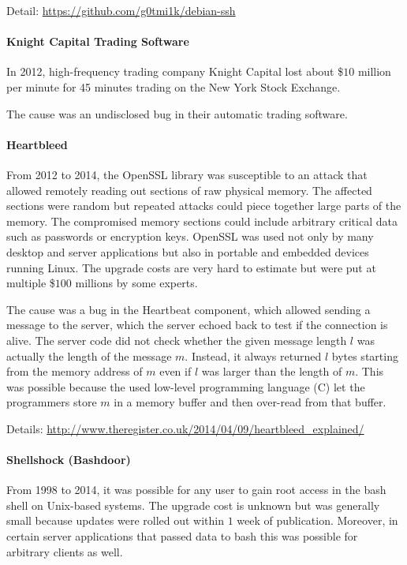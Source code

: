 Detail: \url{https://github.com/g0tmi1k/debian-ssh}

\paragraph{Knight Capital Trading Software}
In 2012, high-frequency trading company Knight Capital lost about \$$10$ million per minute for 45 minutes trading on the New York Stock Exchange.

The cause was an undisclosed bug in their automatic trading software.

\paragraph{Heartbleed}
From 2012 to 2014, the OpenSSL library was susceptible to an attack that allowed remotely reading out sections of raw physical memory.
The affected sections were random but repeated attacks could piece together large parts of the memory.
The compromised memory sections could include arbitrary critical data such as passwords or encryption keys.
OpenSSL was used not only by many desktop and server applications but also in portable and embedded devices running Linux.
The upgrade costs are very hard to estimate but were put at multiple \$$100$ millions by some experts.

The cause was a bug in the Heartbeat component, which allowed sending a message to the server, which the server echoed back to test if the connection is alive.
The server code did not check whether the given message length $l$ was actually the length of the message $m$.
Instead, it always returned $l$ bytes starting from the memory address of $m$ even if $l$ was larger than the length of $m$.
This was possible because the used low-level programming language (C) let the programmers store $m$ in a memory buffer and then over-read from that buffer.

Details: \url{http://www.theregister.co.uk/2014/04/09/heartbleed_explained/}

\paragraph{Shellshock (Bashdoor)}
From 1998 to 2014, it was possible for any user to gain root access in the bash shell on Unix-based systems.
The upgrade cost is unknown but was generally small because updates were rolled out within $1$ week of publication.
Moreover, in certain server applications that passed data to bash this was possible for arbitrary clients as well.

